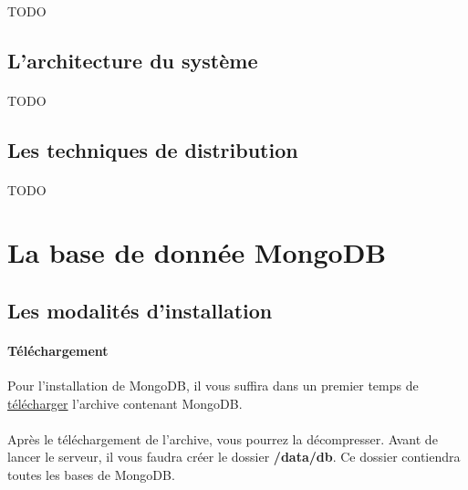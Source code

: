 \documentclass{article}
\begin{document}
  \paragraph{} TODO
\subsection{L’architecture du système}
  \paragraph{} TODO
\subsection{Les techniques de distribution}
  \paragraph{} TODO
  
  
  
  
\section{La base de donnée MongoDB}
\subsection{Les modalités d’installation}
  \paragraph{Téléchargement} Pour l'installation de MongoDB, il vous suffira
  dans un premier temps de \href{https://www.mongodb.com/download-center#community}{télécharger} 
  l'archive contenant MongoDB.
  \paragraph{} Après le téléchargement de l'archive, vous pourrez la décompresser. Avant
  de lancer le serveur, il vous faudra créer le dossier \textbf{/data/db}. Ce dossier
  contiendra toutes les bases de MongoDB.
\end{document}

